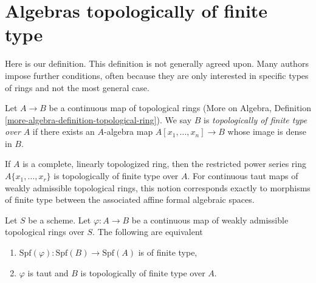 \section{Algebras topologically of finite type}
\label{section-tft}

\noindent
Here is our definition. This definition is not generally agreed upon.
Many authors impose further conditions, often because they are only
interested in specific types of rings and not the most general case.

\begin{definition}
\label{definition-topologically-finite-type}
Let $A \to B$ be a continuous map of topological rings
(More on Algebra, Definition \ref{more-algebra-definition-topological-ring}).
We say $B$ is {\it topologically of finite type over} $A$ if
there exists an $A$-algebra map $A[x_1, \ldots, x_n] \to B$ whose
image is dense in $B$.
\end{definition}

\noindent
If $A$ is a complete, linearly topologized ring, then the restricted
power series ring $A\{x_1, \ldots, x_r\}$ is topologically of finite
type over $A$. For continuous taut maps of weakly admissible topological rings,
this notion corresponds exactly to morphisms of finite type
between the associated affine formal algebraic spaces.

\begin{lemma}
\label{lemma-topologically-finite-type-finite-type}
Let $S$ be a scheme. Let $\varphi : A \to B$ be a continuous map of
weakly admissible topological rings over $S$. The following
are equivalent
\begin{enumerate}
\item $\text{Spf}(\varphi) : \text{Spf}(B) \to \text{Spf}(A)$
is of finite type,
\item $\varphi$ is taut and $B$ is topologically of finite type over $A$.
\end{enumerate}
\end{lemma}

